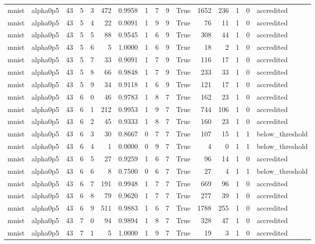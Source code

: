 \begin{tabular}{llrrrrrrrrrrrrrl}
mnist & alpha0p5 & 43 & 5 & 3 & 472 & 0.9958 & 1 & 7 & 9 & True & 1652 & 236 & 1 & 0 & accredited \\
mnist & alpha0p5 & 43 & 5 & 4 & 22 & 0.9091 & 1 & 9 & 9 & True & 76 & 11 & 1 & 0 & accredited \\
mnist & alpha0p5 & 43 & 5 & 5 & 88 & 0.9545 & 1 & 6 & 9 & True & 308 & 44 & 1 & 0 & accredited \\
mnist & alpha0p5 & 43 & 5 & 6 & 5 & 1.0000 & 1 & 6 & 9 & True & 18 & 2 & 1 & 0 & accredited \\
mnist & alpha0p5 & 43 & 5 & 7 & 33 & 0.9091 & 1 & 7 & 9 & True & 116 & 17 & 1 & 0 & accredited \\
mnist & alpha0p5 & 43 & 5 & 8 & 66 & 0.9848 & 1 & 7 & 9 & True & 233 & 33 & 1 & 0 & accredited \\
mnist & alpha0p5 & 43 & 5 & 9 & 34 & 0.9118 & 1 & 6 & 9 & True & 121 & 17 & 1 & 0 & accredited \\
mnist & alpha0p5 & 43 & 6 & 0 & 46 & 0.9783 & 1 & 8 & 7 & True & 162 & 23 & 1 & 0 & accredited \\
mnist & alpha0p5 & 43 & 6 & 1 & 212 & 0.9953 & 1 & 9 & 7 & True & 744 & 106 & 1 & 0 & accredited \\
mnist & alpha0p5 & 43 & 6 & 2 & 45 & 0.9333 & 1 & 8 & 7 & True & 160 & 23 & 1 & 0 & accredited \\
mnist & alpha0p5 & 43 & 6 & 3 & 30 & 0.8667 & 0 & 7 & 7 & True & 107 & 15 & 1 & 1 & below\_threshold \\
mnist & alpha0p5 & 43 & 6 & 4 & 1 & 0.0000 & 0 & 9 & 7 & True & 4 & 0 & 1 & 1 & below\_threshold \\
mnist & alpha0p5 & 43 & 6 & 5 & 27 & 0.9259 & 1 & 6 & 7 & True & 96 & 14 & 1 & 0 & accredited \\
mnist & alpha0p5 & 43 & 6 & 6 & 8 & 0.7500 & 0 & 6 & 7 & True & 27 & 4 & 1 & 1 & below\_threshold \\
mnist & alpha0p5 & 43 & 6 & 7 & 191 & 0.9948 & 1 & 7 & 7 & True & 669 & 96 & 1 & 0 & accredited \\
mnist & alpha0p5 & 43 & 6 & 8 & 79 & 0.9620 & 1 & 7 & 7 & True & 277 & 39 & 1 & 0 & accredited \\
mnist & alpha0p5 & 43 & 6 & 9 & 511 & 0.9883 & 1 & 6 & 7 & True & 1788 & 255 & 1 & 0 & accredited \\
mnist & alpha0p5 & 43 & 7 & 0 & 94 & 0.9894 & 1 & 8 & 7 & True & 328 & 47 & 1 & 0 & accredited \\
mnist & alpha0p5 & 43 & 7 & 1 & 5 & 1.0000 & 1 & 9 & 7 & True & 19 & 3 & 1 & 0 & accredited \\

\end{tabular}
